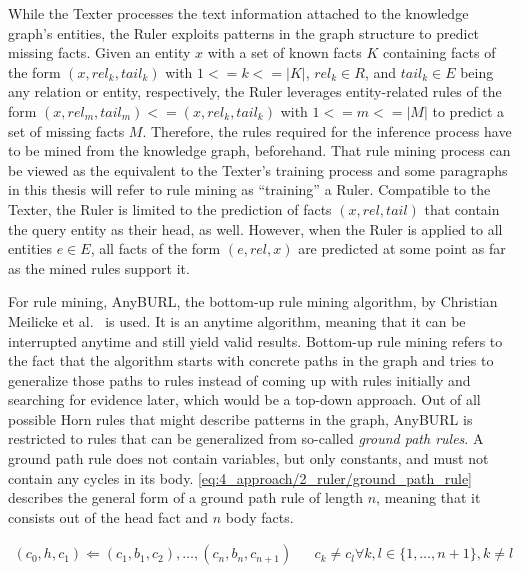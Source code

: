 While the Texter processes the text information attached to the knowledge graph's entities, the Ruler exploits patterns in the graph structure to predict missing facts. Given an entity $x$ with a set of known facts $K$ containing facts of the form $(x, rel_k, tail_k)$ with $1 <= k <= |K|$, $rel_k \in R$, and $tail_k \in E$ being any relation or entity, respectively, the Ruler leverages entity-related rules of the form $(x, rel_m, tail_m) <= (x, rel_k, tail_k)$ with $1 <= m <= |M|$ to predict a set of missing facts $M$. Therefore, the rules required for the inference process have to be mined from the knowledge graph, beforehand. That rule mining process can be viewed as the equivalent to the Texter's training process and some paragraphs in this thesis will refer to rule mining as ``training'' a Ruler. Compatible to the Texter, the Ruler is limited to the prediction of facts $(x, rel, tail)$ that contain the query entity as their head, as well. However, when the Ruler is applied to all entities $e \in E$, all facts of the form $(e, rel, x)$ are predicted at some point as far as the mined rules support it.

For rule mining, AnyBURL, the bottom-up rule mining algorithm, by Christian Meilicke et al.~\cite{Meilicke2019AnytimeBR} is used. It is an anytime algorithm, meaning that it can be interrupted anytime and still yield valid results. Bottom-up rule mining refers to the fact that the algorithm starts with concrete paths in the graph and tries to generalize those paths to rules instead of coming up with rules initially and searching for evidence later, which would be a top-down approach. Out of all possible Horn rules that might describe patterns in the graph, AnyBURL is restricted to rules that can be generalized from so-called \emph{ground path rules}. A ground path rule does not contain variables, but only constants, and must not contain any cycles in its body. \autoref{eq:4_approach/2_ruler/ground_path_rule} describes the general form of a ground path rule of length $n$, meaning that it consists out of the head fact and $n$ body facts.

\begin{align}
(c_0, h, c_1)
    \Leftarrow (c_1, b_1, c_2), \dots, (c_n, b_n, c_{n+1}) &&
    c_k \neq c_l \forall k, l \in \{1, \dots, n+1\}, k \ne l
    \label{eq:4_approach/2_ruler/ground_path_rule}
\end{align}

